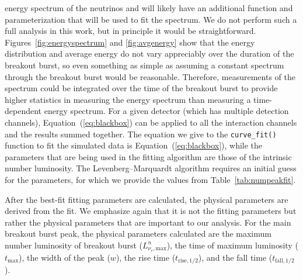 energy spectrum of the neutrinos and will likely have an additional
function and parameterization that will be used to fit the spectrum.
We do not perform such a full analysis in this work, but in principle
it would be straightforward. Figures~\ref{fig:energyspectrum}
and \ref{fig:avgenergy} show that the energy distribution and average
energy do not vary appreciably over the duration of the breakout
burst, so even something as simple as assuming a constant spectrum
through the breakout burst would be reasonable.  
Therefore, measurements of the spectrum could be integrated over
the time of the breakout burst to provide higher statistics in
measuring the energy spectrum than measuring a time-dependent
energy spectrum.  
For a given detector (which has
multiple detection channels), Equation~(\ref{eq:blackbox}) can be applied
to all the interaction channels and the results summed together.
The equation we give to
the \texttt{curve\_fit()} function to fit the simulated data is
Equation~(\ref{eq:blackbox}), while the parameters that are being used
in the fitting algorithm are those of the intrinsic number
luminosity. 
The Levenberg--Marquardt algorithm requires an initial guess for the
parameters, for which we provide the values from
Table~\ref{tab:numpeakfit}.

After the best-fit fitting parameters are calculated, the physical
parameters are derived from the fit.  
We emphasize again that it is not the fitting parameters but rather the
physical parameters that are important to
our analysis.  For the main breakout burst peak, the physical parameters
calculated are the
 maximum number luminosity of breakout burst
($L^n_{\nu_e,\mathrm{max}}$),
the time of maximum luminosity ($t_{\mathrm{max}}$), the width of the
peak ($w$),
the rise time ($t_{\mathrm{rise},1/2}$), and the fall time
($t_{\mathrm{fall},1/2}$).  

